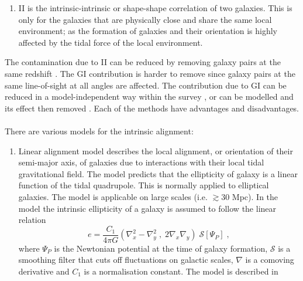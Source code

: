 {\begin{enumerate}
is the correlation between the intrinsic ellipticity of one galaxy with the shear of another galaxy. This 
happens when a foreground galaxy ellipticity is correlated via IA to structure of the lens that 
shears a background galaxy. A lens causes background galaxies to be aligned tangentially while galaxies 
physically close to the lens are stretched radially towards the lens due to tidal forces. This produces a negative GI correlation. 
\item II is the intrinsic-intrinsic or shape-shape correlation of two galaxies. This is 
only for the galaxies that are physically close and share the same local environment; as the 
formation of galaxies and their orientation is highly affected by the tidal force of the local environment. 
\end{enumerate}
The contamination due to II can be reduced by removing galaxy pairs at the same 
redshift \citep{2003MNRAS.339..711H,2002A&A...396..411K,2003A&A...398...23K}. The GI 
contribution is harder to remove since galaxy pairs at the same line-of-sight at all angles are affected. 
The contribution due to GI can be reduced in a model-independent way 
within the survey \citep{2008A&A...477...43J,2009A&A...507..105J}, or can be modelled 
and its effect then removed \citep{2005A&A...441...47K,2010A&A...523A...1J}. Each of the methods 
have advantages and disadvantages. 
\\
\\
There are various models for the intrinsic alignment:
\begin{enumerate}
\item Linear alignment model describes the local alignment, or orientation of their semi-major axis, of galaxies due to interactions with their local tidal gravitational field. The model predicts that the ellipticity of 
galaxy is a linear function of the tidal quadrupole. This is normally applied to elliptical galaxies. 
The model is applicable on large scales (i.e. $\gtrsim 30$ Mpc). 
In the model the intrinsic ellipticity of a galaxy is assumed to follow the linear relation
\begin{equation}
e = \frac{C_1}{4\pi G}\left( \nabla^2_x - \nabla^2_y \; , \; 2\nabla_x \nabla_y \right) \; \mathcal{S}[\Psi_P] \; ,
\end{equation}
where $\Psi_P$ is the Newtonian potential at the time of galaxy formation, $\mathcal{S}$ is a smoothing filter that cuts off fluctuations on galactic scales, $\nabla$ is a comoving derivative and $C_1$ is a normalisation constant. The model is described in \cite{2001MNRAS.320L...7C,2004PhRvD..70f3526H,2010PhRvD..82d9901H} 

\end{enumerate}}
